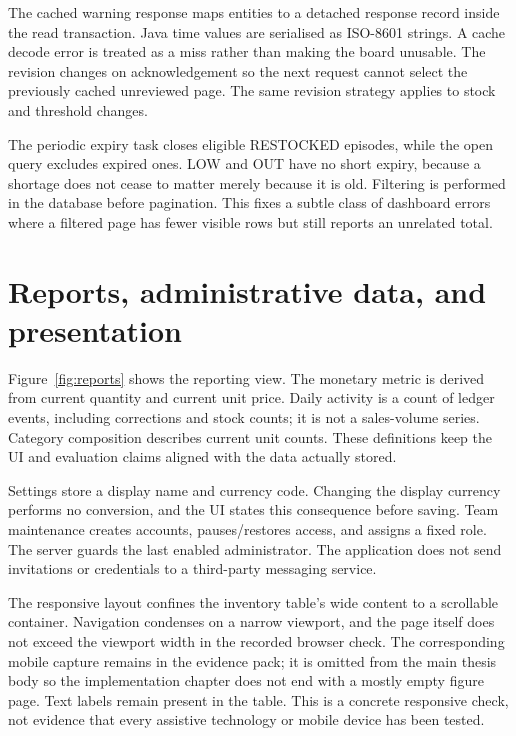 
The cached warning response maps entities to a detached response record inside the read transaction. Java time values are serialised as ISO-8601 strings. A cache decode error is treated as a miss rather than making the board unusable. The revision changes on acknowledgement so the next request cannot select the previously cached unreviewed page. The same revision strategy applies to stock and threshold changes.

The periodic expiry task closes eligible RESTOCKED episodes, while the open query excludes expired ones. LOW and OUT have no short expiry, because a shortage does not cease to matter merely because it is old. Filtering is performed in the database before pagination. This fixes a subtle class of dashboard errors where a filtered page has fewer visible rows but still reports an unrelated total.

\section{Reports, administrative data, and presentation}
Figure~\ref{fig:reports} shows the reporting view. The monetary metric is derived from current quantity and current unit price. Daily activity is a count of ledger events, including corrections and stock counts; it is not a sales-volume series. Category composition describes current unit counts. These definitions keep the UI and evaluation claims aligned with the data actually stored.


Settings store a display name and currency code. Changing the display currency performs no conversion, and the UI states this consequence before saving. Team maintenance creates accounts, pauses/restores access, and assigns a fixed role. The server guards the last enabled administrator. The application does not send invitations or credentials to a third-party messaging service.

The responsive layout confines the inventory table's wide content to a scrollable container. Navigation condenses on a narrow viewport, and the page itself does not exceed the viewport width in the recorded browser check. The corresponding mobile capture remains in the evidence pack; it is omitted from the main thesis body so the implementation chapter does not end with a mostly empty figure page. Text labels remain present in the table. This is a concrete responsive check, not evidence that every assistive technology or mobile device has been tested.

